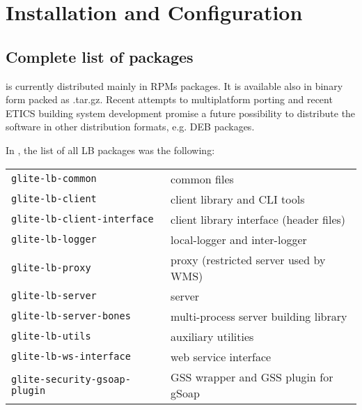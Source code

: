 %
%
\section{Installation and Configuration}

\subsection{Complete list of packages}

\LB is currently distributed mainly in RPMs packages. It is available also in
binary form packed as .tar.gz. Recent attempts to multiplatform porting and
recent ETICS building system development promise a future possibility to
distribute the software in other distribution formats, e.g. DEB packages. 

In , the list of all LB packages was the following:

\begin{tabularx}{\textwidth}{>{\tt}lX}
glite-lb-common & common files \\ 
glite-lb-client & client library and CLI tools\\ 
glite-lb-client-interface & client library interface (header files) \\ 
glite-lb-logger & local-logger and inter-logger \\ 
glite-lb-proxy & proxy (restricted server used by WMS)\\ 
glite-lb-server & server \\ 
glite-lb-server-bones & multi-process server building library \\ 
glite-lb-utils & auxiliary utilities \\ 
glite-lb-ws-interface & web service interface  \\
glite-security-gsoap-plugin & GSS wrapper and GSS plugin for gSoap
\end{tabularx}

